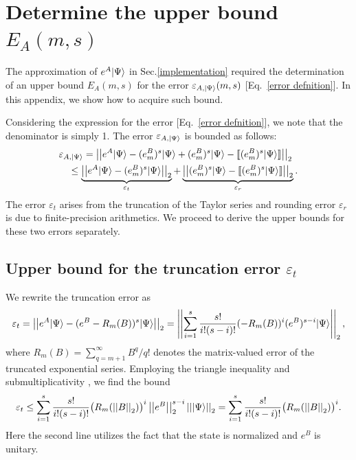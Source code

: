 \section{Determine the upper bound $E_A(m,s)$}
\label{errorupperbound}
The approximation of $e^A|\Psi\rangle$ in Sec.\ref{implementation} required the determination of an upper bound $E_A(m,s)$ for the error $\varepsilon_{A,|\Psi\rangle}(m,s)$ [Eq.\ \eqref{error defnition}]. In this appendix, we show how to acquire such bound.

Considering the expression for the error [Eq.\ \eqref{error defnition}], we note that the denominator is simply 1. The error $\varepsilon_{A,|\Psi\rangle}$ is bounded as follows:
\begin{align}
\nonumber    &\varepsilon_{A,|\Psi\rangle}
    =\left|\left|e^A|\Psi\rangle-(e^B_m)^s|\Psi\rangle+(e^B_m)^s|\Psi\rangle-\llbracket (e^B_m)^s|\Psi\rangle\rrbracket\right|\right|_2\\
\nonumber    &\quad \leq \underbrace{\left|\left|e^A|\Psi\rangle-(e^B_m)^s|\Psi\rangle\right|\right|_2}_{\varepsilon_t}+\underbrace{\left|\left|(e^B_m)^s|\Psi\rangle-\llbracket (e^B_m)^s|\Psi\rangle\rrbracket\right|\right|_2}_{\varepsilon_r}.\\
\label{epsilonA}
\end{align}
The  error $\varepsilon_t$ arises from the truncation of the Taylor series  and rounding error $\varepsilon_r$ is due to finite-precision arithmetics. We proceed to derive the upper bounds for these two errors separately.

\subsection{Upper bound for the truncation error $\varepsilon_t$}
We rewrite the truncation error as
\begin{equation}
    \varepsilon_t = \left|\left|e^A|\Psi\rangle-(e^B-R_m(B))^s|\Psi\rangle\right|\right|_2=  \left|\left|\sum_{i=1}^{s}\frac{s!}{i!(s-i)!} (-R_m(B))^i(e^B)^{s-i}|\Psi\rangle\right|\right|_2,
\end{equation}
where $R_m(B)=\sum_{q=m+1}^{\infty}B^q/q!$ denotes the matrix-valued error of the truncated exponential series.
Employing the triangle inequality and submultiplicativity \cite{higham2002accuracy}, we find the bound
\begin{equation}
    \varepsilon_t \leq 
    \sum_{i=1}^{s}\frac{s!}{i!(s-i)!}\big(R_m(\left|\left|B\right|\right|_2)\big)^i\left|\left|e^B\right|\right|_2^{s-i}\left|\left||\Psi\rangle\right|\right|_2=\sum_{i=1}^{s}\frac{s!}{i!(s-i)!}\big(R_m(\left|\left|B\right|\right|_2)\big)^i.
\end{equation}
Here the second line utilizes the fact that the state is normalized and $e^B$ is unitary. 

